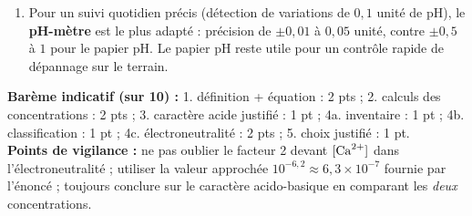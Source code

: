\documentclass[11pt]{article}
\begin{document}
\begin{corrige}
\begin{enumerate}
\begin{enumerate}
\end{enumerate}
\item Pour un suivi quotidien précis (détection de variations de $0{,}1$ unité de pH), le \textbf{pH-mètre} est le plus adapté : précision de $\pm 0{,}01$ à $0{,}05$ unité, contre $\pm 0{,}5$ à $1$ pour le papier pH. Le papier pH reste utile pour un contrôle rapide de dépannage sur le terrain.
\end{enumerate}
\textbf{Barème indicatif (sur 10) :} 1. définition + équation : 2 pts ; 2. calculs des concentrations : 2 pts ; 3. caractère acide justifié : 1 pt ; 4a. inventaire : 1 pt ; 4b. classification : 1 pt ; 4c. électroneutralité : 2 pts ; 5. choix justifié : 1 pt.\\
\textbf{Points de vigilance :} ne pas oublier le facteur 2 devant $[\ce{Ca^2+}]$ dans l'électroneutralité ; utiliser la valeur approchée $10^{-6{,}2} \approx 6{,}3\times10^{-7}$ fournie par l'énoncé ; toujours conclure sur le caractère acido-basique en comparant les \emph{deux} concentrations.
\end{corrige}
\end{document}
